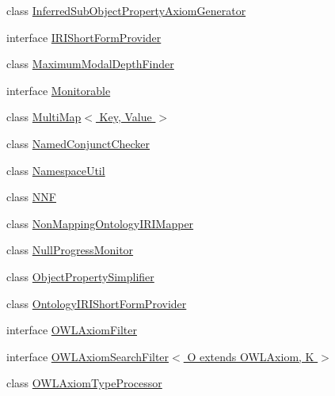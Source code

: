 \begin{DoxyCompactItemize}
\item 
class \hyperlink{classorg_1_1semanticweb_1_1owlapi_1_1util_1_1_inferred_sub_object_property_axiom_generator}{Inferred\-Sub\-Object\-Property\-Axiom\-Generator}
\item 
interface \hyperlink{interfaceorg_1_1semanticweb_1_1owlapi_1_1util_1_1_i_r_i_short_form_provider}{I\-R\-I\-Short\-Form\-Provider}
\item 
class \hyperlink{classorg_1_1semanticweb_1_1owlapi_1_1util_1_1_maximum_modal_depth_finder}{Maximum\-Modal\-Depth\-Finder}
\item 
interface \hyperlink{interfaceorg_1_1semanticweb_1_1owlapi_1_1util_1_1_monitorable}{Monitorable}
\item 
class \hyperlink{classorg_1_1semanticweb_1_1owlapi_1_1util_1_1_multi_map_3_01_key_00_01_value_01_4}{Multi\-Map$<$ Key, Value $>$}
\item 
class \hyperlink{classorg_1_1semanticweb_1_1owlapi_1_1util_1_1_named_conjunct_checker}{Named\-Conjunct\-Checker}
\item 
class \hyperlink{classorg_1_1semanticweb_1_1owlapi_1_1util_1_1_namespace_util}{Namespace\-Util}
\item 
class \hyperlink{classorg_1_1semanticweb_1_1owlapi_1_1util_1_1_n_n_f}{N\-N\-F}
\item 
class \hyperlink{classorg_1_1semanticweb_1_1owlapi_1_1util_1_1_non_mapping_ontology_i_r_i_mapper}{Non\-Mapping\-Ontology\-I\-R\-I\-Mapper}
\item 
class \hyperlink{classorg_1_1semanticweb_1_1owlapi_1_1util_1_1_null_progress_monitor}{Null\-Progress\-Monitor}
\item 
class \hyperlink{classorg_1_1semanticweb_1_1owlapi_1_1util_1_1_object_property_simplifier}{Object\-Property\-Simplifier}
\item 
class \hyperlink{classorg_1_1semanticweb_1_1owlapi_1_1util_1_1_ontology_i_r_i_short_form_provider}{Ontology\-I\-R\-I\-Short\-Form\-Provider}
\item 
interface \hyperlink{interfaceorg_1_1semanticweb_1_1owlapi_1_1util_1_1_o_w_l_axiom_filter}{O\-W\-L\-Axiom\-Filter}
\item 
interface \hyperlink{interfaceorg_1_1semanticweb_1_1owlapi_1_1util_1_1_o_w_l_axiom_search_filter_3_01_o_01extends_01_o_w_l_axiom_00_01_k_01_4}{O\-W\-L\-Axiom\-Search\-Filter$<$ O extends O\-W\-L\-Axiom, K $>$}
\item 
class \hyperlink{classorg_1_1semanticweb_1_1owlapi_1_1util_1_1_o_w_l_axiom_type_processor}{O\-W\-L\-Axiom\-Type\-Processor}
\item 

\end{DoxyCompactItemize}
